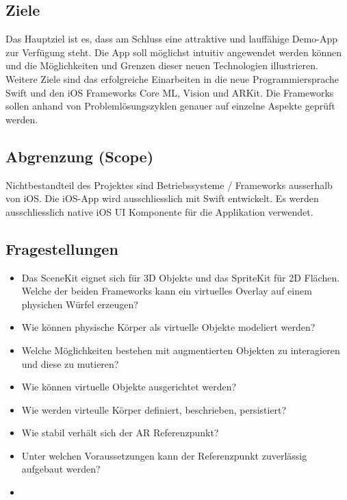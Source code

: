\subsection{Ziele}
Das Hauptziel ist es, dass am Schluss eine attraktive und lauffähige Demo-App zur Verfügung steht. Die App soll möglichst intuitiv angewendet werden können und die Möglichkeiten und Grenzen dieser neuen Technologien illustrieren. Weitere Ziele sind das erfolgreiche Einarbeiten in die neue Programmiersprache Swift und den iOS Frameworks Core ML, Vision und ARKit. Die Frameworks sollen anhand von Problemlösungszyklen genauer auf einzelne Aspekte geprüft werden.

\subsection{Abgrenzung (Scope)}
Nichtbestandteil des Projektes sind Betriebssysteme / Frameworks ausserhalb von iOS. Die iOS-App wird ausschliesslich mit Swift entwickelt. Es werden ausschliesslich native iOS UI Komponente für die Applikation verwendet.

\subsection{Fragestellungen}
\begin{itemize}
	\item Das SceneKit eignet sich für 3D Objekte und das SpriteKit für 2D Flächen. Welche der beiden Frameworks kann ein virtuelles Overlay auf einem physichen Würfel erzeugen?
	\item Wie können physische Körper als virtuelle Objekte modeliert werden?
	\item Welche Möglichkeiten bestehen mit augmentierten Objekten zu interagieren und diese zu mutieren?
	\item Wie können virtuelle Objekte ausgerichtet werden?
	\item Wie werden virteulle Körper definiert, beschrieben, persistiert?
	\item Wie stabil verhält sich der AR Referenzpunkt?
	\item Unter welchen Voraussetzungen kann der Referenzpunkt zuverlässig aufgebaut werden?
	\item 
\end{itemize}

